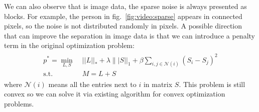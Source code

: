 \documentclass{../../common/projectreport}
\begin{document}
We can also observe that is image data, the sparse noise is always presented as blocks. For example, the person in fig.~\ref{fig:video:sparse} appears in connected pixels, so the noise is not distributed randomly in pixels. A possible direction that can improve the separation in image data is that we can introduce a penalty term in the original optimization problem:
\begin{align}
\begin{split}
p^* = \min_{L,S} \; &||L||_{*} + \lambda \||S||_{1} + \beta\sum_{i, j\in\mathcal{N}(i)}^{} (S_{i} - S_{j})^2\\
\text{s.t.} \quad &M = L+S
\end{split}
\label{applications:discussion}
\end{align}
where $\mathcal{N}(i)$ means all the entries next to $i$ in matrix $S$. This problem is still convex so we can solve it via existing algorithm for convex optimization problems.



\end{document}
